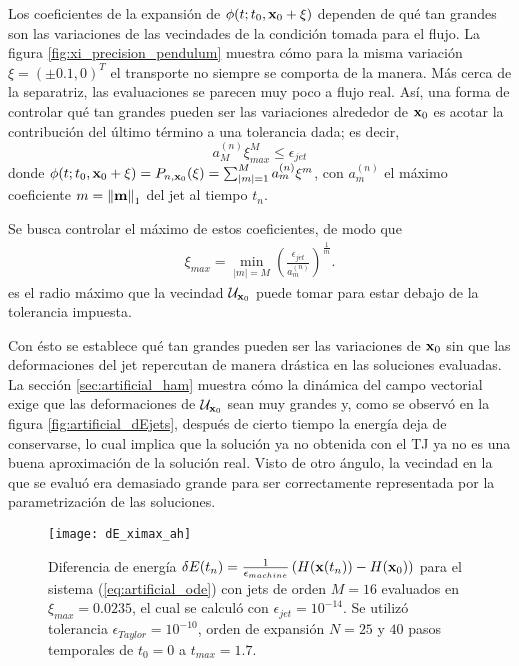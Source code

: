 Los coeficientes de la expansión de $\phi(t;t_0,\mathbf{x}_0 + \xi)$ dependen de qué tan grandes son las variaciones de las vecindades de la condición tomada para el flujo. La figura \ref{fig:xi_precision_pendulum} muestra cómo para la misma variación $\xi = (\pm 0.1, 0)^T$ el transporte no siempre se comporta de la manera. Más cerca de la separatriz, las evaluaciones se parecen muy poco a flujo real. Así, una forma de controlar qué tan grandes pueden ser las variaciones alrededor de $\mathbf{x}_0$ es acotar la contribución del último término a una tolerancia dada; es decir,
\begin{equation*}
 a_{M}^{(n)}\xi_{max}^M \leq \epsilon_{jet}
\end{equation*}
donde $\phi(t;t_0,\mathbf{x}_0 + \xi) = P_{n,\mathbf{x}_0}(\xi) = \sum_{|m|=1}^M  a_{m}^{(n)} \xi^m$, con $a_{m}^{(n)}$ el máximo coeficiente $m = \left\lVert\mathbf{m}\right\rVert_1$ del jet al tiempo $t_n$.

Se busca controlar el máximo de estos coeficientes, de modo que 
\begin{align}
 \xi_{max} = \min_{|m|=M} \left( \frac{\epsilon_{jet}}{a_{m}^{(n)}} \right)^{\frac{1}{m}}.
 \label{eq:ximax}
\end{align}
es el radio máximo que la vecindad $\mathcal{U}_{\mathbf{x}_0}$ puede tomar para estar debajo de la tolerancia impuesta. 

Con ésto se establece qué tan grandes pueden ser las variaciones de $\mathbf{x}_0$ sin que las deformaciones del jet repercutan de manera drástica en las soluciones evaluadas. La sección \ref{sec:artificial_ham} muestra cómo la dinámica del campo vectorial exige que las deformaciones de $\mathcal{U}_{\mathbf{x}_0}$ sean muy grandes y, como se observó en la figura \ref{fig:artificial_dEjets}, después de cierto tiempo la energía deja de conservarse, lo cual implica que la solución ya no obtenida con el TJ ya no es una buena aproximación de la solución real. Visto de otro ángulo, la vecindad en la que se evaluó era demasiado grande para ser correctamente representada por la parametrización de las soluciones.

\begin{figure}[h!]
	\centering
	\texttt{[image: dE\_ximax\_ah]}
	\caption{Diferencia de energía $\delta E(t_n) = \frac{1}{\epsilon_{machine}} \left( H(\mathbf{x}(t_n)) - H(\mathbf{x}_0) \right)$ para el sistema (\ref{eq:artificial_ode}) con jets de orden $M=16$ evaluados en $\xi_{max} = 0.0235$, el cual se calculó con $\epsilon_{jet} = 10^{-14}$. Se utilizó tolerancia $\epsilon_{Taylor} = 10^{-10}$, orden de expansión $N = 25$ y $40$ pasos temporales de $t_0 = 0$ a $t_{max} = 1.7$.}
	\label{fig:dE_ximax_ah}
\end{figure}


